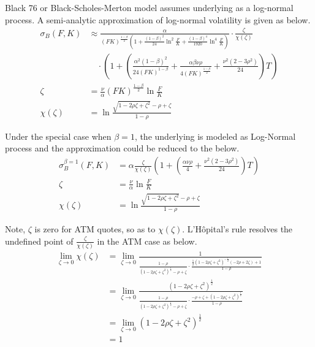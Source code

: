 \documentclass{article}
\begin{document}
Black 76 or Black-Scholes-Merton model assumes underlying as a log-normal process.
A semi-analytic approximation of log-normal volatility is given as below.
\begin{subequations}
    \begin{align}
        \sigma_B{(F, K)} &\approx \frac{\alpha}{(FK)^{\frac{1 - \beta}{2}}\left(1 + \frac{\left(1 - \beta\right)^2}{24} \ln^2{\frac{F}{K}} + \frac{{\left(1 - \beta\right)}^{4}}{1920} \ln^4{\frac{F}{K}}\right)} \cdot \frac{\zeta}{\chi (\zeta)} \nonumber \\
        & \quad \cdot \left(1 + \left(\frac{\alpha^2 {\left(1 - \beta\right)}^{2}}{24 \left(F K\right)^{1 - \beta}} + \frac{\alpha \beta \nu \rho}{4 {\left(F K\right)}^{\frac{1 - \beta}{2}}} + \frac{\nu^2 \left(2 - 3 \rho^2\right)}{24}\right) T\right)\\
        \zeta &= \frac{\nu}{\alpha} {(F K)}^{\frac{1 - \beta}{2}} \ln{\frac{F}{K}} \\
        \chi(\zeta) &= \ln{\frac{\sqrt{1 - 2 \rho \zeta + {\zeta}^2} - \rho + \zeta}{1 - \rho}}
    \end{align}
\end{subequations}

Under the special case when $ \beta = 1 $, the underlying is modeled as Log-Normal process and the approximation could be reduced to the below.
\begin{subequations} \label{SABR_LogNormal_Beta_1}
    \begin{align}
        \sigma_B^{\beta = 1}{(F, K)} &= \alpha \frac{\zeta}{\chi(\zeta)} \left(1 + \left(\frac{\alpha \nu \rho}{4} + \frac{\nu^2 \left(2 - 3 \rho^2\right)}{24}\right) T \right) \\
        \zeta &= \frac{\nu}{\alpha} \ln{\frac{F}{K}} \\
        \chi(\zeta) &= \ln{\frac{\sqrt{1 - 2 \rho \zeta + \zeta^2} - \rho + \zeta}{1 - \rho}}
    \end{align}
\end{subequations}

Note, $ \zeta $ is zero for ATM quotes, so as to $ \chi(\zeta) $.
L'H\^opital's rule resolves the undefined point of $ \frac{\zeta}{\chi(\zeta)} $ in the ATM case as below.
\begin{align}
    \lim_{\zeta \to 0}{\chi(\zeta)} &= \lim_{\zeta \to 0}{\frac{1}{\frac{1 - \rho}{\left(1 - 2 \rho \zeta + \zeta^2\right)^{\frac{1}{2}} - \rho + \zeta} \cdot \frac{\frac{1}{2}\left(1 - 2 \rho \zeta + \zeta^2\right)^{-\frac{1}{2}}\left(-2\rho + 2 \zeta \right) + 1}{1 - \rho}}} \nonumber \\
    &= \lim_{\zeta \to 0}{\frac{\left(1 - 2 \rho \zeta + \zeta^2\right)^{\frac{1}{2}}}{\frac{1 - \rho}{\left(1 - 2 \rho \zeta + \zeta^2\right)^{\frac{1}{2}} - \rho + \zeta} \cdot \frac{-\rho + \zeta + \left(1 - 2 \rho \zeta + \zeta^2\right)^{\frac{1}{2}}}{1 - \rho}}} \nonumber \\
    &= \lim_{\zeta \to 0}{\left(1 - 2 \rho \zeta + \zeta^2\right)^{\frac{1}{2}}} \nonumber \\
    &= 1
\end{align}
\end{document}
